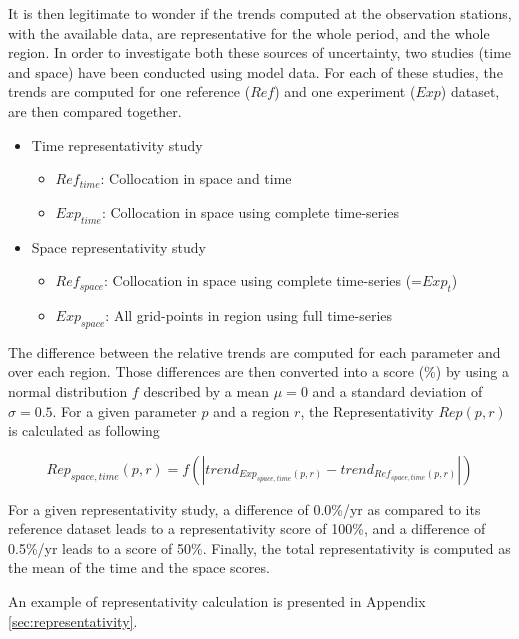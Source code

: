 \documentclass[journal abbreviation, manuscript]{copernicus}
\begin{document}
It is then legitimate to wonder if the trends computed at the observation stations, with the available data, are representative for the whole period, and the whole region. In order to investigate both these sources of uncertainty, two studies (time and space) have been conducted using model data. For each of these studies, the trends are computed for one reference ($Ref$) and one experiment ($Exp$) dataset, are then compared together.
\begin{itemize}
 \item Time representativity study
       \begin{itemize}
        \item $Ref_{time}$: Collocation in space and time
        \item $Exp_{time}$: Collocation in space using complete time-series
       \end{itemize}
 \item Space representativity study
       \begin{itemize}
        \item $Ref_{space}$: Collocation in space using complete time-series (=$Exp_{t}$)
        \item $Exp_{space}$: All grid-points in region using full time-series
       \end{itemize}
\end{itemize}

The difference between the relative trends are computed for each parameter and over each region. Those differences are then converted into a score (\unit{\%}) by using a normal distribution $f$ described by a mean $\mu=0$ and a standard deviation of $\sigma=0.5$. For a given parameter $p$ and a region $r$, the Representativity $Rep(p,r)$ is calculated as following

\begin{equation}
 Rep_{space,time}(p, r) = {f\left(\left| trend_{Exp_{space,time}(p, r)}-trend_{Ref_{space,time}(p, r)} \right|\right)}
\end{equation}

For a given representativity study, a difference of 0.0\%/yr as compared to its reference dataset leads to a representativity score of 100\%, and a difference of 0.5\%/yr leads to a score of 50\%.
Finally, the total representativity is computed as the mean of the time and the space scores.

An example of representativity calculation is presented in Appendix \ref{sec:representativity}.
\end{document}

